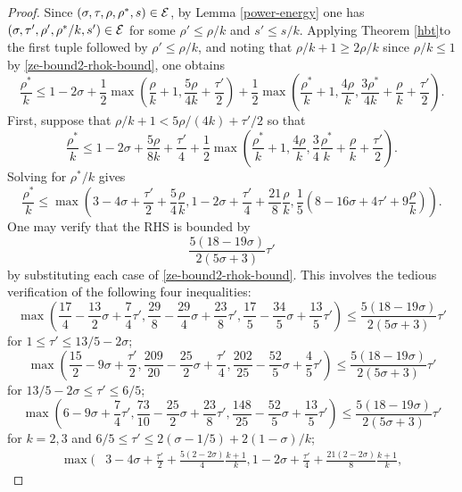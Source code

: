 \begin{proof}
Since $(\sigma, \tau, \rho, \rho^*, s) \in \mathcal{E}$, by Lemma \ref{power-energy} one has $(\sigma, \tau', \rho', \rho^*/k, s') \in \mathcal{E}$ for some $\rho' \le \rho/k$ and $s'\le s/k$. Applying Theorem \eqref{hbt}to the first tuple followed by $\rho' \le \rho/k$, and noting that $\rho/k + 1 \ge 2\rho/k$ since $\rho/k \le 1$ by \eqref{ze-bound2-rhok-bound}, one obtains
\begin{equation}\label{ze-bound2-rhostar-boundk}
\frac{\rho^*}{k} \le 1-2\sigma + \frac{1}{2}\max\left(\frac{\rho}{k}+1, \frac{5\rho}{4k} + \frac{\tau'}{2}\right) + \frac{1}{2}\max\left(\frac{\rho^*}{k}+1, \frac{4\rho}{k}, \frac{3\rho^*}{4k} +\frac{\rho}{k}+\frac{\tau'}{2}\right).
\end{equation}
First, suppose that $\rho/k  + 1 < 5\rho/(4k) + \tau'/2$ so that
\[
\frac{\rho^*}{k} \leq 1-2\sigma + \frac{5\rho}{8k} + \frac{\tau'}{4} + \frac{1}{2}\max\left(\frac{\rho^*}{k}+1, \frac{4\rho}{k}, \frac{3}{4}\frac{\rho^*}{k} + \frac{\rho}{k}+\frac{\tau'}{2}\right).
\]
Solving for $\rho^*/k$ gives
\[
\frac{\rho^*}{k} \le \max\left(3 - 4\sigma + \frac{\tau'}{2} + \frac{5}{4}\frac{\rho}{k}, 1 - 2\sigma + \frac{\tau'}{4} + \frac{21}{8}\frac{\rho}{k}, \frac{1}{5}(8 - 16\sigma + 4\tau' + 9\frac{\rho}{k})\right).
\]
One may verify that the RHS is bounded by
\[
\frac{5(18 - 19\sigma)}{2(5\sigma + 3)}\tau'
\]
by substituting each case of \eqref{ze-bound2-rhok-bound}. This involves the tedious verification of the following four inequalities:
\begin{equation}\label{ze-bound2-rho-case1-1}
\max\left(\frac{17}{4} - \frac{13}{2}\sigma + \frac{7}{4}\tau', \frac{29}{8} - \frac{29}{4}\sigma + \frac{23}{8}\tau', \frac{17}{5} - \frac{34}{5}\sigma + \frac{13}{5}\tau'\right) \le \frac{5(18 - 19\sigma)}{2(5\sigma + 3)}\tau'
\end{equation}
for $1 \le \tau' \le 13/5 - 2\sigma$;
\[
\max\left(\frac{15}{2} - 9\sigma + \frac{\tau'}{2}, \frac{209}{20} - \frac{25}{2}\sigma + \frac{\tau'}{4}, \frac{202}{25} - \frac{52}{5}\sigma + \frac{4}{5}\tau'\right) \le \frac{5(18 - 19\sigma)}{2(5\sigma + 3)}\tau'
\]
for $13/5 - 2\sigma \le \tau' \le 6/5$;
\[
\max\left(6 - 9\sigma + \frac{7}{4}\tau', \frac{73}{10} - \frac{25}{2}\sigma + \frac{23}{8}\tau', \frac{148}{25} - \frac{52}{5}\sigma + \frac{13}{5}\tau'\right) \le \frac{5(18 - 19\sigma)}{2(5\sigma + 3)}\tau'
\]
for $k = 2, 3$ and $6/5 \le \tau' \le 2(\sigma - 1/5) + 2(1-\sigma)/k$;
\begin{equation*}
\begin{split}
\max(&3 - 4\sigma + \frac{\tau'}{2} + \frac{5(2 - 2\sigma)}{4}\frac{k + 1}{k}, 1 - 2\sigma + \frac{\tau'}{4} + \frac{21(2 - 2\sigma)}{8}\frac{k + 1}{k},

\end{split}
\end{equation*}
\end{proof}
